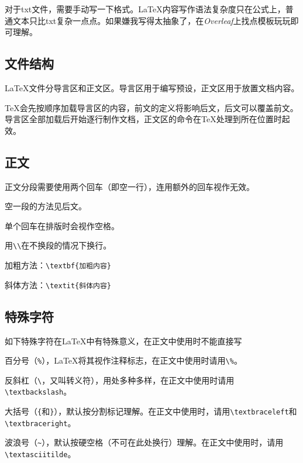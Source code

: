 \documentclass[10pt,openany]{book}
\begin{document}
\begin{sloppypar}
对于txt文件，需要手动写一下格式。{\LaTeX}内容写作语法复杂度只在公式上，普通文本只比txt复杂一点点。如果嫌我写得太抽象了，在\textit{Overleaf}上找点模板玩玩即可理解。

\subsection{文件结构}

{\LaTeX}文件分导言区和正文区。导言区用于编写预设，正文区用于放置文档内容。



{\TeX}会先按顺序加载导言区的内容，前文的定义将影响后文，后文可以覆盖前文。导言区全部加载后开始逐行制作文档，正文区的命令在{\TeX}处理到所在位置时起效。

\subsection{正文}

正文分段需要使用两个回车（即空一行），连用额外的回车视作无效。

空一段的方法见后文\textit{}。

单个回车在排版时会视作空格。

用\texttt{\textbackslash{}\textbackslash{}}在不换段的情况下换行。

加粗方法：\texttt{\textbackslash{}textbf\{加粗内容\}}

斜体方法：\texttt{\textbackslash{}textit\{斜体内容\}}

\subsection{特殊字符}

如下特殊字符在{\LaTeX}中有特殊意义，在正文中使用时不能直接写

百分号（\texttt{\%}），{\LaTeX}将其视作注释标志，在正文中使用时请用\texttt{\textbackslash{}\%}。

反斜杠（\texttt{\textbackslash{}}，又叫转义符），用处多种多样，在正文中使用时请用\texttt{\textbackslash{}textbackslash}。

大括号（\texttt{\{}和\texttt{\}}），默认按分割标记理解。在正文中使用时，请用\texttt{\textbackslash{}textbraceleft}和\texttt{\textbackslash{}textbraceright}。

波浪号（\texttt{\textasciitilde{}}），默认按硬空格（不可在此处换行）理解。在正文中使用时，请用\texttt{\textbackslash{}textasciitilde}。


\end{sloppypar}
\end{document}

